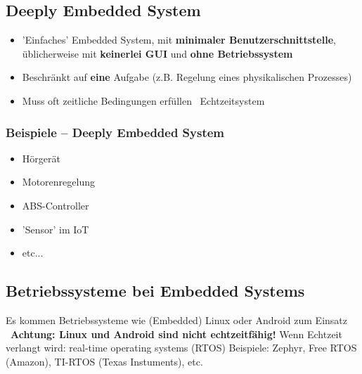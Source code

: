 \subsection{Deeply Embedded System}

\begin{itemize}
    \item 'Einfaches' Embedded System, mit \textbf{minimaler Benutzerschnittstelle}, üblicherweise mit \textbf{keinerlei GUI}
        und \textbf{ohne Betriebssystem}
    \item Beschränkt auf \textbf{eine} Aufgabe (z.B. Regelung eines physikalischen Prozesses)
    \item Muss oft zeitliche Bedingungen erfüllen \textrightarrow\ Echtzeitsystem
\end{itemize}


\subsubsection{Beispiele -- Deeply Embedded System}

\begin{minipage}[t]{0.3\columnwidth}
    \begin{itemize}
        \item Hörgerät
        \item Motorenregelung
    \end{itemize}
\end{minipage}
\hfill
\begin{minipage}[t]{0.3\columnwidth}
    \begin{itemize}
        \item ABS-Controller
        \item 'Sensor' im IoT
    \end{itemize}
\end{minipage}
\hfill
\begin{minipage}[t]{0.3\columnwidth}
    \begin{itemize}
        \item etc...
    \end{itemize}
\end{minipage}


\subsection{Betriebssysteme bei Embedded Systems}

\begin{outline}
    \1 Es kommen Betriebssysteme wie (Embedded) Linux oder Android zum Einsatz \\
        \textrightarrow\ \textbf{Achtung: Linux und Android sind nicht echtzeitfähig!}
    \1 Wenn Echtzeit verlangt wird: real-time operating systems (RTOS)
        \2 Beispiele: Zephyr, Free RTOS (Amazon), TI-RTOS (Texas Instuments), etc.
\end{outline}



